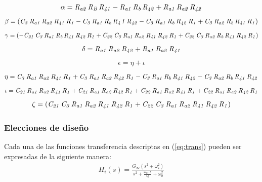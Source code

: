 \begin{align}
\alpha = {\it R_{a2}}\,{\it R_B}\,{\it R_{41}}-{\it R_{a1}}\,{\it R_b}\,{\it R_{42}}+{
\it R_{a1}}\,{\it R_{a2}}\,{\it R_{42}}
\end{align}
\begin{align}
\beta =\left( {\it C_3}\,{\it R_{a1}}\,{\it R_{a2}}\,{
\it R_{41}}\,{\it R_1}-{\it C_3}\,{\it R_{a1}}\,{\it R_b}\,{\it R{_41}}\,{\it R_{42}}-{
\it C_3}\,{\it R_{a1}}\,{\it R_b}\,{\it R_{42}}\,{\it R_1}+{\it C_3}\,{\it R_{a2}}\,{
\it R_b}\,{\it R_{41}}\,{\it R_1} \right)
\end{align}
\begin{align}
\gamma = \left( -{\it C_{21}}\,{\it C_3
}\,{\it R_{a1}}\,{\it R_b}\,{\it R_{41}}\,{\it R_{42}}\,{\it R_1}+{\it C_{22}}\,{\it C_3}
\,{\it R_{a1}}\,{\it R_{a2}}\,{\it R_{41}}\,{\it R_{42}}\,{\it R_1}+{\it C_{22}}\,{\it C_3}
\,{\it R_{a2}}\,{\it R_b}\,{\it R_{41}}\,{\it R_{42}}\,{\it R_1} \right) 
\end{align}
\begin{align}
\delta = {\it R_{a1}}
\,{\it R_{a2}}\,{\it R_{42}}+{\it R_{a1}}\,{\it R_{a2}}\,{\it R_{41}} 
\end{align}
\begin{align}
\epsilon = \eta +  \iota
\end{align}
\begin{align}
\eta ={\it C_3}\,{\it R_{a1}}\,{\it R_{a2}}\,{\it R_{41}}\,{\it R_{1}}+{\it C_3}\,{\it R_{a1}}\,{\it R_{a2}}\,{\it R_{42}}\,{\it R_1}-{\it C_3}\,{\it R_{a1}}\,{\it R_b}\,{\it R_{41}}\,{\it R_{42}}-{
\it C_3}\,{\it R_{a2}}\,{\it R_b}\,{\it R_{41}}\,{\it R_{42}}
\end{align}
\begin{align}
\iota={\it C_{21}}\,{\it R_{a1}}\,{
\it R_{a2}}\,{\it R_{41}}\,{\it R_1}+{\it C_{21}}\,{\it R_{a1}}\,{\it R_{a2}}\,{\it R_{42}}\,{
\it R_1}+{\it C_{22}}\,{\it R_{a1}}\,{\it R_{a2}}\,{\it R_{41}}\,{\it R_1}+{\it C_{22}}\,{
\it R_{a1}}\,{\it R_{a2}}\,{\it R_{42}}\,{\it R_1}
\end{align}
\begin{align}
\zeta = \left( {\it C_{21}}
\,{\it C_3}\,{\it R_{a1}}\,{\it R_{a2}}\,{\it R_{41}}\,{\it R_{42}}\,{\it R_1}+{\it C_{22}}
\,{\it C_3}\,{\it R_{a1}}\,{\it R_{a2}}\,{\it R_{41}}\,{\it R_{42}}\,{\it R_1} \right)
\end{align}
\subsubsection{Elecciones de diseño}
Cada una de las funciones transferencia descriptas en (\ref{eq:trans}) pueden ser expresadas de la siguiente manera:
\begin{align}
	H_i(s)=\frac{G_\infty (s^2+\omega_z^2)}{s^2+\frac{\omega_0 \cdot s}{Q}+\omega_0^2}
\end{align} 

